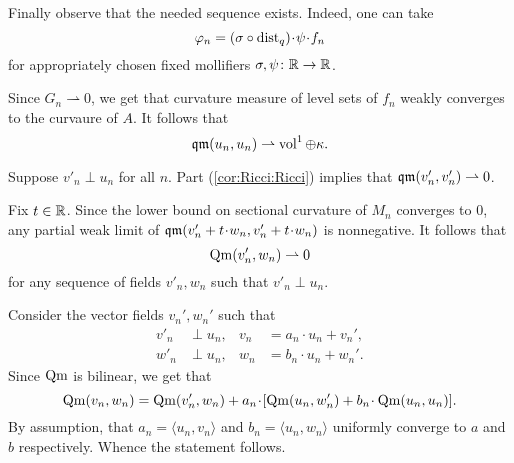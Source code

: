Finally observe that the needed sequence exists.
Indeed, one can take 
\[\phi_n=(\sigma\circ \dist_q)\cdot \psi\cdot f_n\]
for appropriately chosen fixed mollifiers $\sigma,\psi\colon\mathbb{R}\to \mathbb{R}$.

Since $G_n\rightharpoonup 0$, we get that curvature measure of level sets of $f_n$ weakly converges to the curvaure of $A$.
It follows that 
\[\operatorname{\mathfrak{qm}}(u_n,u_n)\rightharpoonup \operatorname{vol}^1\oplus \kappa.\]

Suppose $v'_n\perp u_n$ for all $n$.
Part (\ref{cor:Ricci:Ricci}) implies that  $\operatorname{\mathfrak{qm}}(v'_n,v'_n)\rightharpoonup 0$.

Fix $t\in \mathbb{R}$.
Since the lower bound on sectional curvature of $M_n$ converges to $0$, any partial weak limit of $\qm(v'_n+t\cdot w_n,v'_n+t\cdot w_n)$ is nonnegative.
It follows that 
\[\operatorname{\rm Qm}(v'_n, w_n)\rightharpoonup 0\] for any sequence of fields $v'_n,w_n$ such that $v'_n\perp u_n$.

Consider the vector fields $v_n',w_n'$ such that 
\begin{align*}
v'_n&\perp u_n,
&
v_n&=a_n\cdot u_n+v_n',
\\
w'_n&\perp u_n,
&
w_n&=b_n\cdot u_n+w_n'.
\end{align*}
Since $\operatorname{\rm Qm}$ is bilinear, we get that
\[\Qm(v_n,w_n)=\Qm(v_n',w_n) + a_n\cdot [\Qm(u_n,w_n')+ b_n\cdot \Qm(u_n,u_n)].\]
By assumption, that $a_n=\langle u_n,v_n\rangle $ and $b_n=\langle u_n,w_n\rangle$ uniformly converge to $a$ and $b$ respectively.
Whence the statement follows.
\qeds


